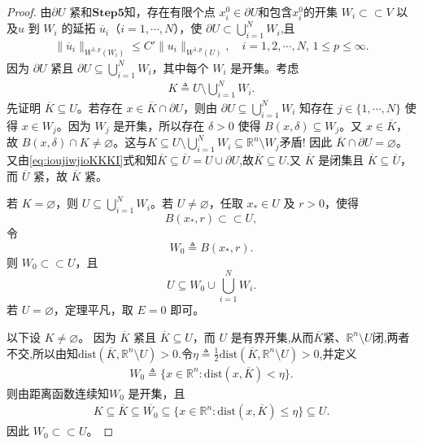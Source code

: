 \documentclass[../../main.tex]{subfiles}%
\begin{document}
\begin{proof}
由$\partial U$ 紧和$\mathbf{Step}\bm{5}$知，存在有限个点 $x_{i}^{0}\in\partial U$和包含$x_i^0$的开集 $W_{i}\subset \subset V$ 以及$u$ 到 $W_{i}$ 的延拓 $\overline{u}_{i}$（$i=1,\cdots,N$），使 $\partial U\subset\bigcup_{i=1}^{N}W_{i}$,且
\begin{align}
\|\overline{u}_i\|_{W^{1,p}(W_i)}
\leqslant C'\|u_i\|_{W^{1,p}(U)},\quad i=1,2,\cdots,N,\,1\leqslant p\leqslant \infty.\label{eq::eEREFFwww1}
\end{align}
因为 \(\partial U\) 紧且 \(\partial U\subseteq\bigcup_{i=1}^N W_i\)，其中每个 \(W_i\) 是开集。考虑
\begin{align}\label{eq:ioujiwjioKKKI}
K\triangleq U\setminus\bigcup_{i=1}^N W_i.
\end{align}
先证明 \(\overline{K}\subseteq U\)。若存在 \(x\in\overline{K}\cap\partial U\)，则由 \(\partial U\subseteq\bigcup_{i=1}^N W_i\) 知存在 \(j\in\{1,\cdots,N\}\) 使得 \(x\in W_j\)。因为 \(W_j\) 是开集，所以存在 \(\delta>0\) 使得 \(B(x,\delta)\subseteq W_j\)。又 \(x\in\overline{K}\)，故 \(B(x,\delta)\cap K\neq\varnothing\)。这与$K\subseteq U\setminus\bigcup_{i=1}^N W_i\subseteq \mathbb{R}^n\setminus W_j$矛盾!
因此 \(\overline{K}\cap\partial U=\varnothing\)。又由\eqref{eq:ioujiwjioKKKI}式和知\(\overline{K}\subseteq \overline{U}=U\cup \partial U\),故$\overline{K}\subseteq U$.又 \(\overline{K}\) 是闭集且 \(\overline{K}\subseteq\overline{U}\)，而 \(\overline{U}\) 紧，故 \(\overline{K}\) 紧。

若 \(K=\varnothing\)，则 \(U\subseteq\bigcup_{i=1}^{N}W_i\)。若 \(U\neq\varnothing\)，任取 \(x_*\in U\) 及 \(r>0\)，使得
\[
B(x_*,r)\subset\subset U,
\]
令
\[
W_0\triangleq B(x_*,r).
\]
则 \(W_0\subset\subset U\)，且
\[
U\subseteq W_0\cup\bigcup_{i=1}^{N}W_i.
\]
若 \(U=\varnothing\)，定理平凡，取 \(E=0\) 即可。

以下设 \(K\neq\varnothing\)。
因为 \(\overline{K}\) 紧且 \(\overline{K}\subseteq U\)，而 \(U\) 是有界开集,从而\(\overline{K}\)紧、$\mathbb{R}^n\setminus U$闭,两者不交,所以由知$\mathrm{dist}(\overline{K},\mathbb{R}^n\setminus U)>0$.令$\eta\triangleq\frac{1}{2}\mathrm{dist}(\overline{K},\mathbb{R}^n\setminus U)>0$,并定义
\begin{align*}
W_0\triangleq\{x\in\mathbb{R}^n:\mathrm{dist}(x,\overline{K})<\eta\}.
\end{align*}
则由距离函数连续知\(W_0\) 是开集，且
\begin{align*}
K\subseteq \overline{K}\subseteq \overline{W_0}\subseteq\{x\in\mathbb{R}^n:\mathrm{dist}(x,\overline{K})\leqslant\eta\}\subseteq U.
\end{align*}
因此 \(W_0\subset\subset U\)。


\end{proof}
\end{document}
